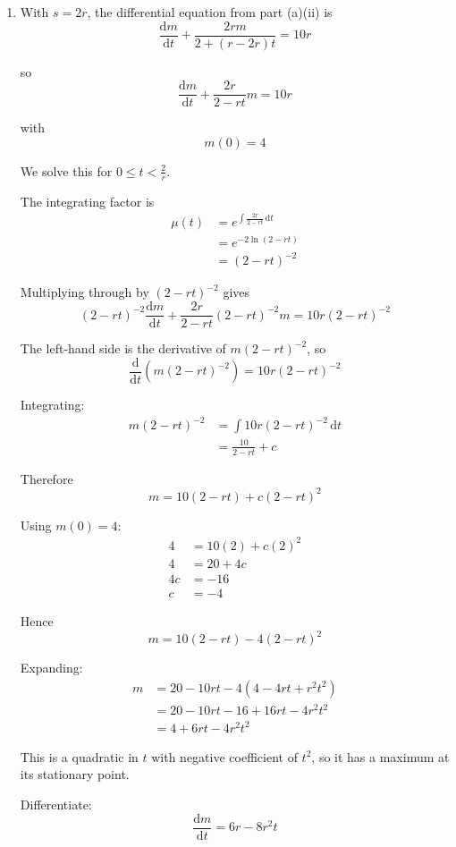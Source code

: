 \documentclass[leqno]{article}
\begin{document}
\begin{enumerate}[
  label=\textbf{\arabic*.},
  leftmargin=*,
  topsep=0pt,
  partopsep=0pt,
  parsep=0pt
]
\begin{djsSolution}
\begin{enumerate}[label=\textbf{(\alph*)}]
\begin{enumerate}[label=(\roman*)]
    \item With $s=2r$, the differential equation from part (a)(ii) is
    \[
    \frac{\mathrm{d}m}{\mathrm{d}t}+\frac{2rm}{2+(r-2r)t}=10r
    \]

    so
    \[
    \frac{\mathrm{d}m}{\mathrm{d}t}+\frac{2r}{2-rt}m=10r
    \]

    with
    \[
    m(0)=4
    \]

    We solve this for $0\leq t<\frac{2}{r}$.

    The integrating factor is
    \begin{align*}
    \mu(t)&=e^{\int \frac{2r}{2-rt}\,\mathrm{d}t}\\
    &=e^{-2\ln(2-rt)} \\
    &= (2-rt)^{-2}
    \end{align*}

    Multiplying through by $(2-rt)^{-2}$ gives
    \[
    (2-rt)^{-2}\frac{\mathrm{d}m}{\mathrm{d}t}+\frac{2r}{2-rt}(2-rt)^{-2}m=10r(2-rt)^{-2}
    \]

    The left-hand side is the derivative of $m(2-rt)^{-2}$, so
    \[
    \frac{\mathrm{d}}{\mathrm{d}t}\left(m(2-rt)^{-2}\right)=10r(2-rt)^{-2}
    \]

    Integrating:
    \begin{align*}
    m(2-rt)^{-2} &= \int 10r(2-rt)^{-2}\,\mathrm{d}t \\
    &= \frac{10}{2-rt}+c
    \end{align*}

    Therefore
    \[
    m=10(2-rt)+c(2-rt)^2
    \]

    Using $m(0)=4$:
    \begin{align*}
    4 &= 10(2)+c(2)^2 \\
    4 &= 20+4c \\
    4c &= -16 \\
    c &= -4
    \end{align*}

    Hence
    \[
    m=10(2-rt)-4(2-rt)^2
    \]

    Expanding:
    \begin{align*}
    m &= 20-10rt-4(4-4rt+r^2t^2) \\
    &= 20-10rt-16+16rt-4r^2t^2 \\
    &= 4+6rt-4r^2t^2
    \end{align*}

    This is a quadratic in $t$ with negative coefficient of $t^2$, so it has a maximum at its stationary point.

    Differentiate:
    \[
    \frac{\mathrm{d}m}{\mathrm{d}t}=6r-8r^2t
    \]


\end{enumerate}
\end{enumerate}
\end{djsSolution}
\end{enumerate}
\end{document}
